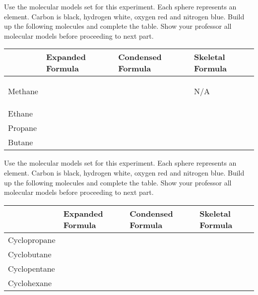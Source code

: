 \documentclass[main.tex]{subfiles}
\begin{document}
\vspace{0.2cm}{\large \bfseries Linear Alkanes}
Use the molecular models set for this experiment. Each sphere represents an element. Carbon is black, hydrogen white, oxygen red and nitrogen blue. Build up the following molecules and complete the table. Show your professor all molecular models before proceeding to next part.
\begin{center}\resizebox{18cm}{!} {\begin{tabular}{ |p{1.3cm}|p{5cm}| m{5cm}| m{5cm}| }
\hline
    & Expanded Formula &   Condensed Formula & Skeletal Formula   \\
\hline
\vspace{0cm}Methane\vspace{1.5cm} &       & & \begin{center}\Huge N/A\end{center} \\
\hline
\vspace{0cm}Ethane\vspace{1.5cm} &    &    & \\
\hline
\vspace{0cm}Propane\vspace{1.5cm} &  &      & \\
\hline
\vspace{0cm}Butane\vspace{1.5cm} &  &      & \\
\hline
\end{tabular}}\end{center}
 

\newpage
 
\vspace{0.2cm}{\large \bfseries Cyclic Alkanes}
Use the molecular models set for this experiment. Each sphere represents an element. Carbon is black, hydrogen white, oxygen red and nitrogen blue. Build up the following molecules and complete the table. Show your professor all molecular models before proceeding to next part.
\begin{center}\resizebox{18cm}{!} {\begin{tabular}{ |p{2cm}|p{5cm}| m{5cm}| m{5cm}| }
\hline
    & Expanded Formula &   Condensed Formula & Skeletal Formula   \\
\hline
\vspace{0cm}Cyclopropane\vspace{1.5cm} &       & &  \\
\hline
\vspace{0cm}Cyclobutane\vspace{1.5cm} &    &    & \\
\hline
\vspace{0cm}Cyclopentane\vspace{1.5cm} &  &      & \\
\hline
\vspace{0cm}Cyclohexane\vspace{1.5cm} &  &      & \\
\hline
\end{tabular}}\end{center}
\end{document}

